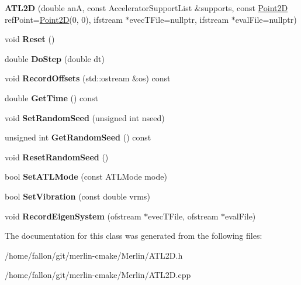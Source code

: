 \begin{DoxyCompactItemize}
\item 
\mbox{\label{classATL2D_a508d8ea70eba237e929dedb2f56a18ac}} 
{\bfseries A\+T\+L2D} (double anA, const Accelerator\+Support\+List \&supports, const \hyperlink{classTVec2D}{Point2D} ref\+Point=\hyperlink{classTVec2D}{Point2D}(0, 0), ifstream $\ast$evec\+T\+File=nullptr, ifstream $\ast$eval\+File=nullptr)
\item 
\mbox{\label{classATL2D_ac63fb4a4064f82f12962809ba42dc876}} 
void {\bfseries Reset} ()
\item 
\mbox{\label{classATL2D_ab89d4ac472d16428f05862da37c6a775}} 
double {\bfseries Do\+Step} (double dt)
\item 
\mbox{\label{classATL2D_a82db2b069d935cbd55a94b95036db641}} 
void {\bfseries Record\+Offsets} (std\+::ostream \&os) const
\item 
\mbox{\label{classATL2D_a71428bd01bf47b361b09ff410851bbe4}} 
double {\bfseries Get\+Time} () const
\item 
\mbox{\label{classATL2D_a06c110e3eac5943a4dc811a1b8c0c312}} 
void {\bfseries Set\+Random\+Seed} (unsigned int nseed)
\item 
\mbox{\label{classATL2D_ac1adf7295344bbab22b6eccfeee7538e}} 
unsigned int {\bfseries Get\+Random\+Seed} () const
\item 
\mbox{\label{classATL2D_a1ea2e3c38ce8345fc3331cbe7e87ab4a}} 
void {\bfseries Reset\+Random\+Seed} ()
\item 
\mbox{\label{classATL2D_a017e4c5e7e34b0320812ba7757bce60a}} 
bool {\bfseries Set\+A\+T\+L\+Mode} (const A\+T\+L\+Mode mode)
\item 
\mbox{\label{classATL2D_aa96730144a50df16e195e61a4eeb9380}} 
bool {\bfseries Set\+Vibration} (const double vrms)
\item 
\mbox{\label{classATL2D_adf994271afcce311a67c63fe094a3423}} 
void {\bfseries Record\+Eigen\+System} (ofstream $\ast$evec\+T\+File, ofstream $\ast$eval\+File)
\end{DoxyCompactItemize}


The documentation for this class was generated from the following files\+:\begin{DoxyCompactItemize}
\item 
/home/fallon/git/merlin-\/cmake/\+Merlin/A\+T\+L2\+D.\+h\item 
/home/fallon/git/merlin-\/cmake/\+Merlin/A\+T\+L2\+D.\+cpp\end{DoxyCompactItemize}
